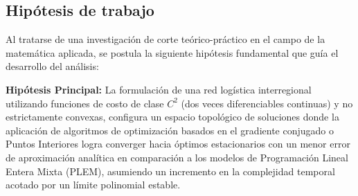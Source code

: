 \subsection{Hipótesis de trabajo}
Al tratarse de una investigación de corte teórico-práctico en el campo de la matemática aplicada, se postula la siguiente hipótesis fundamental que guía el desarrollo del análisis:

\textbf{Hipótesis Principal:}
La formulación de una red logística interregional utilizando funciones de costo de clase $C^2$ (dos veces diferenciables continuas) y no estrictamente convexas, configura un espacio topológico de soluciones donde la aplicación de algoritmos de optimización basados en el gradiente conjugado o Puntos Interiores logra converger hacia óptimos estacionarios con un menor error de aproximación analítica en comparación a los modelos de Programación Lineal Entera Mixta (PLEM), asumiendo un incremento en la complejidad temporal acotado por un límite polinomial estable.
